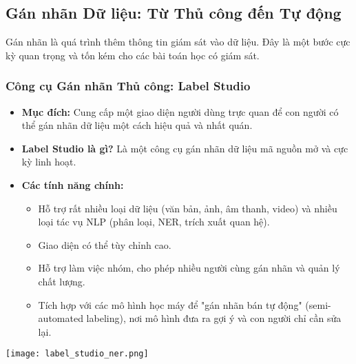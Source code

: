 \subsection{Gán nhãn Dữ liệu: Từ Thủ công đến Tự động}
\label{ssec:data_labeling_methods}
Gán nhãn là quá trình thêm thông tin giám sát vào dữ liệu. Đây là một bước cực kỳ quan trọng và tốn kém cho các bài toán học có giám sát.

\subsubsection{Công cụ Gán nhãn Thủ công: Label Studio}
\begin{itemize}
    \item \textbf{Mục đích:} Cung cấp một giao diện người dùng trực quan để con người có thể gán nhãn dữ liệu một cách hiệu quả và nhất quán.
    \item \textbf{Label Studio là gì?} Là một công cụ gán nhãn dữ liệu mã nguồn mở và cực kỳ linh hoạt.
    \item \textbf{Các tính năng chính:}
        \begin{itemize}
            \item Hỗ trợ rất nhiều loại dữ liệu (văn bản, ảnh, âm thanh, video) và nhiều loại tác vụ NLP (phân loại, NER, trích xuất quan hệ).
            \item Giao diện có thể tùy chỉnh cao.
            \item Hỗ trợ làm việc nhóm, cho phép nhiều người cùng gán nhãn và quản lý chất lượng.
            \item Tích hợp với các mô hình học máy để "gán nhãn bán tự động" (semi-automated labeling), nơi mô hình đưa ra gợi ý và con người chỉ cần sửa lại.
        \end{itemize}
\end{itemize}
\begin{center}
    \texttt{[image: label\_studio\_ner.png]}
    \label{fig:label_studio_ner}
\end{center}


